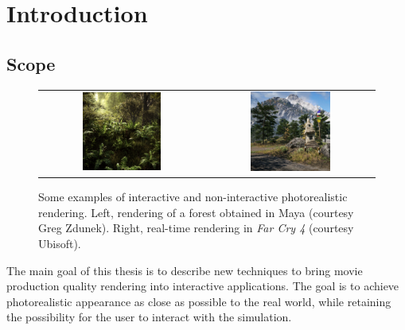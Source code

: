 \chapter{Introduction}
\label{sec:intro}
\section{Scope}
\begin{figure}
\centering
\begin{tabular}{@{}c@{}c@{}}
	 \includegraphics[width=0.5\textwidth]{figures/forest-maya-crop.jpg} & 	 \includegraphics[width=0.5\textwidth]{figures/far-cry-4-crop.jpg} \\
\end{tabular}
\caption{Some examples of interactive and non-interactive photorealistic rendering. Left, rendering of a forest obtained in Maya (courtesy Greg Zdunek). Right, real-time rendering in \emph{Far Cry 4} (courtesy Ubisoft). } 
\label{fig:main_examples}
\end{figure}
%
The main goal of this thesis is to describe new techniques to bring movie production quality rendering into interactive applications.  The goal is to achieve photorealistic appearance as close as possible to the real world, while retaining the possibility for the user to interact with the simulation. 
